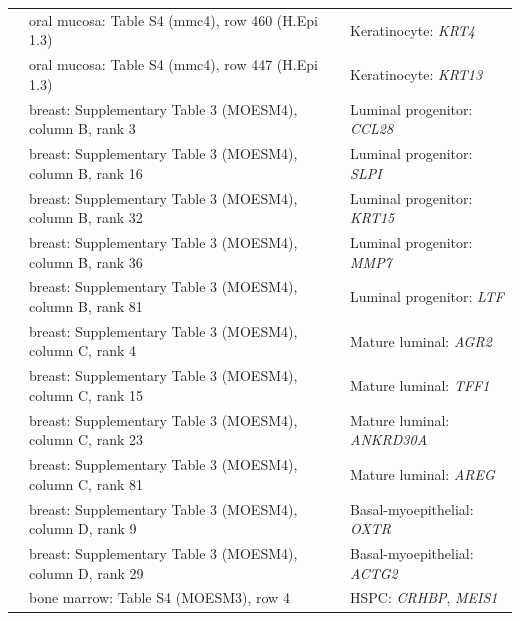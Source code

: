 \begin{longtable}{@{}>{\raggedright\arraybackslash}p{2.0cm} >{\raggedright\arraybackslash}p{4.6cm} >{\raggedright\arraybackslash}p{8.4cm}@{}}
\cite{williamsHumanOralMucosa2021} & oral mucosa: Table S4 (mmc4), row 460 (H.Epi 1.3) & Keratinocyte: \textit{KRT4} \\
\cite{williamsHumanOralMucosa2021} & oral mucosa: Table S4 (mmc4), row 447 (H.Epi 1.3) & Keratinocyte: \textit{KRT13} \\
\cite{reedSinglecellAtlasEnables2024} & breast: Supplementary Table 3 (MOESM4), column B, rank 3 & Luminal progenitor: \textit{CCL28} \\
\cite{reedSinglecellAtlasEnables2024} & breast: Supplementary Table 3 (MOESM4), column B, rank 16 & Luminal progenitor: \textit{SLPI} \\
\cite{reedSinglecellAtlasEnables2024} & breast: Supplementary Table 3 (MOESM4), column B, rank 32 & Luminal progenitor: \textit{KRT15} \\
\cite{reedSinglecellAtlasEnables2024} & breast: Supplementary Table 3 (MOESM4), column B, rank 36 & Luminal progenitor: \textit{MMP7} \\
\cite{reedSinglecellAtlasEnables2024} & breast: Supplementary Table 3 (MOESM4), column B, rank 81 & Luminal progenitor: \textit{LTF} \\
\cite{reedSinglecellAtlasEnables2024} & breast: Supplementary Table 3 (MOESM4), column C, rank 4 & Mature luminal: \textit{AGR2} \\
\cite{reedSinglecellAtlasEnables2024} & breast: Supplementary Table 3 (MOESM4), column C, rank 15 & Mature luminal: \textit{TFF1} \\
\cite{reedSinglecellAtlasEnables2024} & breast: Supplementary Table 3 (MOESM4), column C, rank 23 & Mature luminal: \textit{ANKRD30A} \\
\cite{reedSinglecellAtlasEnables2024} & breast: Supplementary Table 3 (MOESM4), column C, rank 81 & Mature luminal: \textit{AREG} \\
\cite{reedSinglecellAtlasEnables2024} & breast: Supplementary Table 3 (MOESM4), column D, rank 9 & Basal-myoepithelial: \textit{OXTR} \\
\cite{reedSinglecellAtlasEnables2024} & breast: Supplementary Table 3 (MOESM4), column D, rank 29 & Basal-myoepithelial: \textit{ACTG2} \\
\cite{trianaSinglecellProteogenomicReference2021} & bone marrow: Table S4 (MOESM3), row 4 & HSPC: \textit{CRHBP}, \textit{MEIS1} \\
\end{longtable}
